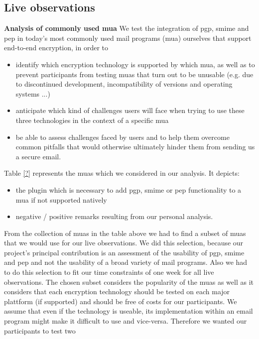 \subsection{Live observations}
\textbf{\newline Analysis of commonly used \acrlong{mua}}
\newline
We test the integration of \acrshort{pgp}, \acrshort{smime} and \acrshort{pep} in today's most commonly used mail programs (\acrshort{mua}) ourselves that support end-to-end encryption, in order to
\begin{itemize}
	\item identify which encryption technology is supported by which \acrshort{mua}, as well as to prevent participants from testing \acrshort{mua}s that turn out to be unusable (e.g. due to discontinued development, incompatibility of versions and operating systems ...)
	\item anticipate which kind of challenges users will face when trying to use these three	technologies in the context of a specific \acrshort{mua}
	\item be able to assess challenges faced by users and to help them overcome common pitfalls that would otherwise ultimately hinder them from sending us a secure \acrshort{email}.
\end{itemize}
Table \ref{?} represents the \acrlong{mua}s which we considered in our analysis. It depicts:
\begin{itemize}
	\item the plugin which is necessary to add \acrshort{pgp}, \acrshort{smime} or \acrshort{pep} functionality to a \acrshort{mua} if not	supported natively
	\item negative / positive remarks resulting from our personal analysis.
\end{itemize}
From the collection of \acrshort{mua}s in the table above we had to find a subset of \acrshort{mua}s that we would use for our live observations. We did this selection, because our project’s principal contribution is an assessment of the usability of \acrshort{pgp}, \acrshort{smime} and \acrshort{pep} and not the usability of a broad variety of mail programs. Also we had to do this selection to fit our time constraints of one week for all live observations. The chosen subset considers the popularity of the \acrshort{mua}s as well as it considers that each encryption technology should be tested on each major plattform (if supported) and should be free of costs for our participants. We assume that even if the technology is useable, its implementation within an \acrshort{email} program might make it difficult to use and vice-versa. Therefore we wanted our participants to test two
